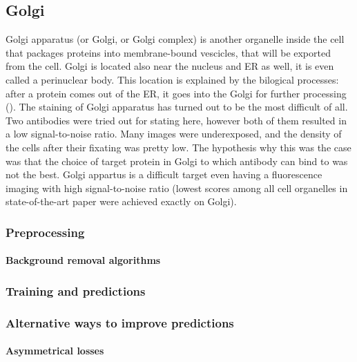 \subsection{Golgi}
    Golgi apparatus (or Golgi, or Golgi complex) is another organelle inside the cell that packages proteins into membrane-bound vescicles, that will be exported from the cell. Golgi is located also near the nucleus and ER as well, it is even called a perinuclear body. This location is explained by the bilogical processes: after a protein comes out of the ER, it goes into the Golgi for further processing (\cite{golgi}). The staining of Golgi apparatus has turned out to be the most difficult of all. Two antibodies were tried out for stating here, however both of them resulted in a low signal-to-noise ratio. Many images were underexposed, and the density of the cells after their fixating was pretty low. The hypothesis why this was the case was that the choice of target protein in Golgi to which antibody can bind to was not the best. Golgi appartus is a difficult target even having a fluorescence imaging with high signal-to-noise ratio (lowest scores among all cell organelles in state-of-the-art \cite{Cheng_2021} paper were achieved exactly on Golgi).
    \subsubsection{Preprocessing}
        
        \paragraph{Background removal algorithms}
            \label{par:background-removal}
            
    \subsubsection{Training and predictions}
        

    \subsubsection{Alternative ways to improve predictions}
        \paragraph{Asymmetrical losses}
            
